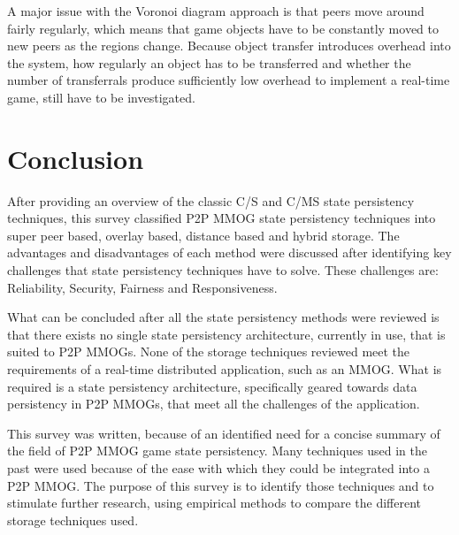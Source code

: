 \documentclass[10pt,a4paper,journal,cspaper,compsoc]{IEEEtran}
\begin{document}
A major issue with the Voronoi diagram approach is that peers move around fairly regularly, which means that game objects have to be constantly moved
to new peers as the regions change. Because object transfer introduces overhead into the system, how regularly an object has to be transferred and
whether the number of transferrals produce sufficiently low overhead to implement a real-time game, still have to be investigated.

\section{Conclusion}


After providing an overview of the classic C/S and C/MS state persistency techniques, this survey classified P2P MMOG state persistency techniques
into super peer based, overlay based, distance based and hybrid storage. The advantages and disadvantages of each method were discussed after
identifying key challenges that state persistency techniques have to solve. These challenges are: Reliability, Security, Fairness and Responsiveness.

What can be concluded after all the state persistency methods were reviewed is that there exists no single state persistency architecture, currently
in use, that is suited to P2P MMOGs. None of the storage techniques reviewed meet the requirements of a real-time distributed application, such as an
MMOG. What is required is a state persistency architecture, specifically geared towards data persistency in P2P MMOGs, that meet all the challenges
of the application.

This survey was written, because of an identified need for a concise summary of the field of P2P MMOG game state persistency. Many techniques used in
the past were used because of the ease with which they could be integrated into a P2P MMOG. The purpose of this survey is to identify those
techniques and to stimulate further research, using empirical methods to compare the different storage techniques used.

\newpage



\end{document}
